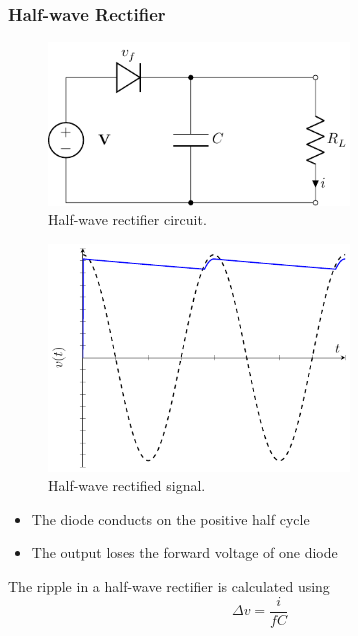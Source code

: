 \documentclass{article}
\begin{document}
\subsubsection{Half-wave Rectifier}
\begin{figure}[H]
    \centering
    \includegraphics[width = 8cm, keepaspectratio = true]{figures/half_wave_rectifier.pdf}
    \caption{Half-wave rectifier circuit.}
\end{figure}
\begin{figure}[H]
    \centering
    \includegraphics[width = 8cm, keepaspectratio = true]{figures/half_wave_rectifier_plot.pdf}
    \caption{Half-wave rectified signal.}
\end{figure}
\begin{itemize}
    \item The diode conducts on the positive half cycle
    \item The output loses the forward voltage of one diode
\end{itemize}
The ripple in a half-wave rectifier is calculated using
\begin{equation*}
    \Delta v = \frac{i}{fC}
\end{equation*}
\end{document}
